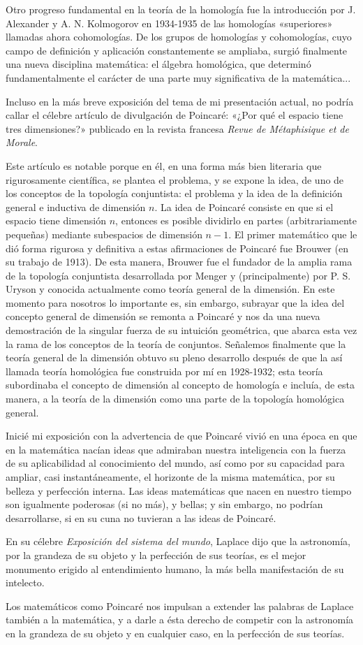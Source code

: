 \documentclass[a4paper, 12pt]{article}
\begin{document}
Otro progreso fundamental en la teoría de la homología fue la introducción por J. Alexander y A. N. Kolmogorov en 1934-1935 de las homologías «superiores» llamadas ahora cohomologías. De los grupos de homologías y cohomologías, cuyo campo de definición y aplicación constantemente se ampliaba, surgió finalmente una nueva disciplina matemática: el álgebra homológica, que determinó fundamentalmente el carácter de una parte muy significativa de la matemática...

Incluso en la más breve exposición del tema de mi presentación actual, no podría callar el célebre artículo de divulgación de Poincaré: «¿Por qué el espacio tiene tres dimensiones?»  publicado en la revista francesa {\it Revue de Métaphisique et de Morale}.

Este artículo es notable porque en él, en una forma más bien literaria que rigurosamente científica, se plantea el problema, y se expone la idea, de uno de los conceptos de la topología conjuntista: el problema y la idea de la definición general e inductiva de dimensión $n$. La idea de Poincaré consiste en que si el espacio tiene dimensión $n$, entonces es posible dividirlo en partes (arbitrariamente pequeñas) mediante subespacios de dimensión $n-1$. El primer matemático que le dió forma rigurosa y definitiva a estas afirmaciones de Poincaré fue Brouwer (en su trabajo de 1913). De esta manera, Brouwer
fue el fundador de la amplia rama de la topología conjuntista desarrollada por Menger y (principalmente) por P. S. Uryson y conocida actualmente como teoría general de la dimensión. En este momento para nosotros lo importante es, sin embargo, subrayar que la idea del concepto general de dimensión se remonta a Poincaré y nos da una nueva demostración de la singular fuerza de su intuición geométrica, que abarca esta vez la rama de los conceptos de la teoría de conjuntos. Señalemos finalmente que la teoría general de la dimensión obtuvo su pleno desarrollo después de que la así llamada teoría homológica fue construida por mí en 1928-1932; esta teoría subordinaba el concepto de dimensión al concepto de homología e incluía, de esta manera, a la teoría de la dimensión como una parte de la topología homológica general.

Inicié mi exposición con la advertencia de que Poincaré vivió en una época en que en la matemática nacían ideas que admiraban nuestra inteligencia con la fuerza de su aplicabilidad al conocimiento del mundo, así como por su capacidad para ampliar, casi instantáneamente, el horizonte de la misma matemática, por su belleza y perfección interna.
 Las ideas matemáticas que nacen en nuestro tiempo son igualmente poderosas (si no más), y bellas; y sin embargo, no podrían desarrollarse, si en su cuna no tuvieran a las ideas de Poincaré.
 
En su célebre {\it Exposición del sistema del mundo}, Laplace dijo que la astronomía, por la grandeza de su objeto y la perfección de sus teorías, es el mejor monumento erigido al entendimiento humano, la más bella manifestación de su intelecto.

Los matemáticos como Poincaré nos impulsan a extender las palabras de Laplace también a la matemática, y a darle a ésta derecho de competir con la astronomía en la grandeza de su objeto y en cualquier caso, en la perfección de sus teorías.
\end{document}
